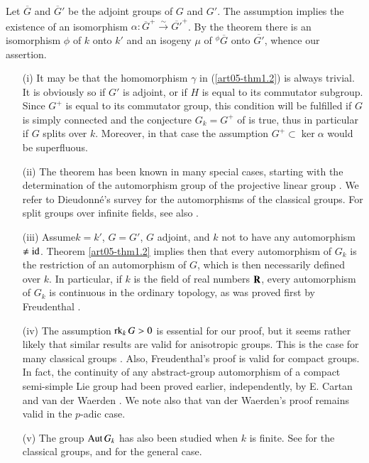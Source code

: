Let $\overline{G}$ and $\overline{G}'$ be the adjoint groups of $G$ and $G'$. The assumption implies the existence of an isomorphism $\alpha:\overline{G}^{+}\xrightarrow{\sim}\overline{G'}^{+}$. By the theorem there is an isomorphism $\phi$ of $k$ onto $k'$ and an isogeny $\mu$ of ${}^{\phi}\overline{G}$ onto $\overline{G'}$, whence our assertion.

\begin{remarks}\label{art05-rem1.4}
\begin{itemize}
\item[(i)] It may be that the homomorphism $\gamma$ in (\ref{art05-thm1.2}) is always trivial. It is obviously so if $G'$ is adjoint, or if $H$ is equal to its commutator subgroup. Since $G^{+}$ is equal to its commutator group, this condition will be fulfilled if $G$ is simply connected and the conjecture $G_{k}=G^{+}$ of \cite{art05-key10} is true, thus in particular if $G$ splits over $k$. Moreover, in that case the assumption $G^{+}\subset \ker \alpha$ would be superfluous.

\item[(ii)] The theorem has been known in many special cases, starting with the determination of the automorphism group of the projective linear group \cite{art05-key7}. We refer to Dieudonn\'e's survey \cite{art05-key4} for the automorphisms of the classical groups. For split groups over infinite fields, see also \cite{art05-key6}.

\item[(iii)] Assume\pageoriginale $k=k'$, $G=G'$, $G$ adjoint, and $k$ not to have any automorphism $\neq \operatorname{\mathrm{id}}$. Theorem \ref{art05-thm1.2} implies then that every automorphism of $G_{k}$ is the restriction of an automorphism of $G$, which is then necessarily defined over $k$. In particular, if $k$ is the field of real numbers $\mathbf{R}$, every automorphism of $G_{k}$ is continuous in the ordinary topology, as was proved first by Freudenthal \cite{art05-key5}.

\item[(iv)] The assumption $\operatorname{\mathrm{rk}}_{k}G>0$ is essential for our proof, but it seems rather likely that similar results are valid for anisotropic groups. This is the case for many classical groups \cite{art05-key4}. Also, Freudenthal's proof is valid for compact groups. In fact, the continuity of any abstract-group automorphism of a compact semi-simple Lie group had been proved earlier, independently, by E. Cartan \cite{art05-key2} and van der Waerden \cite{art05-key11}. We note also that van der Waerden's proof remains valid in the $p$-adic case.

\item[(v)] The group $\operatorname{\mathrm{Aut}} G_{k}$ has also been studied when $k$ is finite. See \cite{art05-key4} for the classical groups, and \cite{art05-key8} for the general case.
\end{itemize}
\end{remarks}

